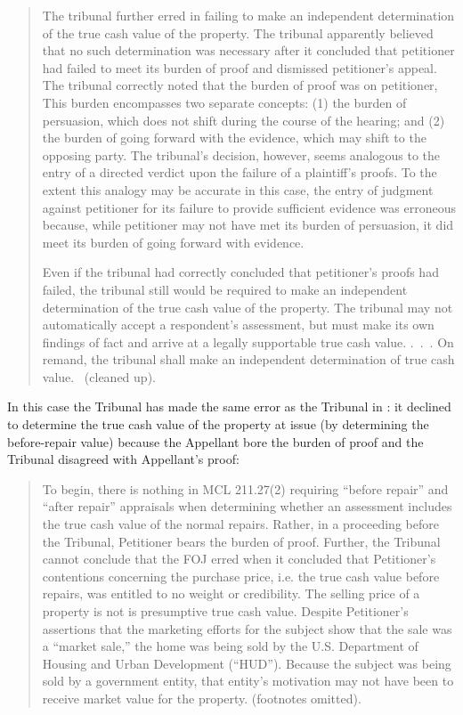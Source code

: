 \documentclass[12pt,\documentclassflag]{michiganCourtOfAppealsBrief}
\begin{document}
\begin{quotation}
The tribunal further erred in failing to make an independent determination of the true cash value of the property. The tribunal apparently believed that no such determination was necessary after it concluded that petitioner had failed to meet its burden of proof and dismissed petitioner's appeal. The tribunal correctly noted that the burden of proof was on petitioner, This burden encompasses two separate concepts: (1) the burden of persuasion, which does not shift during the course of the hearing; and (2) the burden of going forward with the evidence, which may shift to the opposing party. The tribunal's decision, however, seems analogous to the entry of a directed verdict upon the failure of a plaintiff's proofs. To the extent this analogy may be accurate in this case, the entry of judgment against petitioner for its failure to provide sufficient evidence was erroneous because, while petitioner may not have met its burden of persuasion, it did meet its burden of going forward with evidence.
	
	Even if the tribunal had correctly concluded that petitioner's proofs had failed, the tribunal still would be required to make an independent determination of the true cash value of the property. The tribunal may not automatically accept a respondent's assessment, but must make its own findings of fact and arrive at a legally supportable true cash value. .~.~. On remand, the tribunal shall make an independent determination of true cash value. \ (cleaned up).
\end{quotation}

In this case the Tribunal has made the same error as the Tribunal in \cite[s]{Jones & Laughlin}: it declined to determine the true cash value of the property at issue (by determining the before-repair value) because the Appellant bore the burden of proof and the Tribunal disagreed with Appellant's proof:

\begin{quote}
To begin, there is nothing in MCL 211.27(2) requiring ``before repair'' and ``after repair'' appraisals when determining whether an assessment includes the true cash value of the normal repairs. Rather, in a proceeding before the Tribunal, Petitioner bears the burden of proof. Further, the Tribunal cannot conclude that the FOJ erred when it concluded that Petitioner's contentions concerning the purchase price, i.e. the true cash value before repairs, was entitled to no weight or credibility. The selling price of a property is not is presumptive true cash value. Despite Petitioner's assertions that the marketing efforts for the subject show that the sale was a ``market sale,'' the home was being sold by the U.S. Department of Housing and Urban Development (``HUD''). Because the subject was being sold by a government entity, that entity's motivation may not have been to receive market value for the property.
\reconsiderationDenied[2] (footnotes omitted).
\end{quote}
\end{document}
